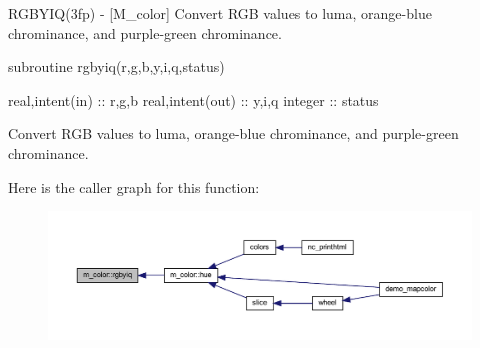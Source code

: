 \begin{DoxyDescription}
\item[\label{_RGBYIQ}%
N\+A\+ME ]R\+G\+B\+Y\+I\+Q(3fp) -\/ \mbox{[}M\+\_\+color\mbox{]} Convert R\+GB values to luma, orange-\/blue chrominance, and purple-\/green chrominance. 


\item[S\+Y\+N\+O\+P\+S\+IS ]
\begin{DoxyPre}
    subroutine rgbyiq(r,g,b,y,i,q,status)\end{DoxyPre}



\begin{DoxyPre}     real,intent(in)  :: r,g,b
     real,intent(out) :: y,i,q
     integer          :: status
    \end{DoxyPre}
 


\item[D\+E\+S\+C\+R\+I\+P\+T\+I\+ON ]Convert R\+GB values to luma, orange-\/blue chrominance, and purple-\/green chrominance. 


\end{DoxyDescription}Here is the caller graph for this function\+:
\nopagebreak
\begin{figure}[H]
\begin{center}
\leavevmode
\includegraphics[width=350pt]{namespacem__color_a386d004a1392b7e01ff66f1676d43def_icgraph}
\end{center}
\end{figure}
\mbox{\label{namespacem__color_ac9cd845fb9975144a6deb3a21ce29a29}} 
